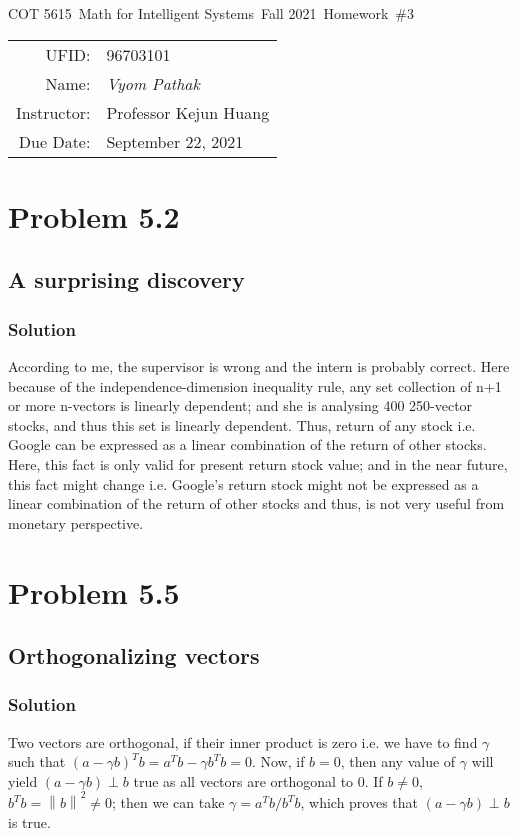 \documentclass{article}
\newcommand{\hmwkTitle}{Homework\ \#3}
\newcommand{\hmwkDueDate}{September 22, 2021}
\newcommand{\hmwkClassCode}{COT 5615}
\newcommand{\hmwkClass}{Math for Intelligent Systems}
\newcommand{\hmwkClassYear}{Fall 2021}
\newcommand{\hmwkClassInstructor}{Professor Kejun Huang}
\newcommand{\hmwkAuthorName}{\textit{Vyom Pathak}}
\newcommand{\hmwkUFID}{96703101}
\newcommand{\norm}[1]{\left\lVert#1\right\rVert}
\begin{document}
\begin{center}
{\Large \hmwkClassCode\ \hmwkClass\ \hmwkClassYear\ \hmwkTitle}

\begin{tabular}{rl}
UFID: & \hmwkUFID \\
Name: & \hmwkAuthorName \\
Instructor: & \hmwkClassInstructor \\
Due Date: & \hmwkDueDate \\ 
\end{tabular}
\end{center}

\section*{Problem 5.2}
\subsection*{A surprising discovery}
\subsubsection*{Solution}
According to me, the supervisor is wrong and the intern is probably correct. Here because of the independence-dimension inequality rule, any set collection of n+1 or more n-vectors is linearly dependent; and she is analysing 400 250-vector stocks, and thus this set is linearly dependent. Thus, return of any stock i.e. Google can be expressed as a linear combination of the return of other stocks.
Here, this fact is only valid for present return stock value; and in the near future, this fact might change i.e. Google's return stock might not be expressed as a linear combination of the return of other stocks and thus, is not very useful from monetary perspective.
\section*{Problem 5.5}
\subsection*{Orthogonalizing vectors}
\subsubsection*{Solution}
Two vectors are orthogonal, if their inner product is zero i.e. we have to find $\gamma$ such that $(a-\gamma b)^Tb=a^Tb-\gamma b^T b=0$. Now, if $b=0$, then any value of $\gamma$ will yield $(a-\gamma b)\perp b$ true as all vectors are orthogonal to 0. If $b\neq0$, $b^Tb = \norm{b}^2\neq0$; then we can take $\gamma=a^Tb/b^Tb$, which proves that $(a-\gamma b)\perp b$ is true.
\end{document}

